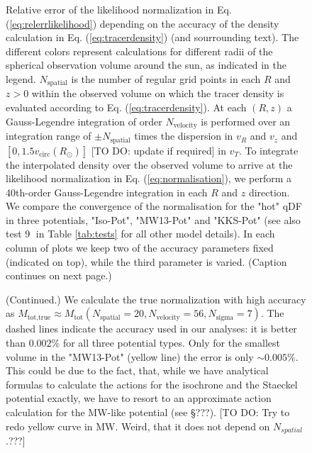 

\begin{figure}
\caption{Relative error of the likelihood normalization in Eq. (\ref{eq:relerrlikelihood}) depending on the accuracy of the density calculation in Eq. (\ref{eq:tracerdensity}) (and sourrounding text). The different colors represent calculations for different radii of the spherical observation volume around the sun, as indicated in the legend. $N_\text{spatial}$ is the number of regular grid points in each $R$ and $z > 0$ within the observed volume on which the tracer density is evaluated according to Eq. (\ref{eq:tracerdensity}). At each $(R,z)$ a Gauss-Legendre integration of order $N_\text{velocity}$ is performed over an integration range of $\pm N_\text{spatial}$ times the dispersion in $v_R$ and $v_z$ and $[0,1.5v_\text{circ}(R_\odot)]$ [TO DO: update if required] in $v_T$. To integrate the interpolated density over the observed volume to arrive at the likelihood normalization in Eq. (\ref{eq:normalisation}), we perform a 40th-order Gauss-Legendre integration in each $R$ and $z$ direction. We compare the convergence of the normalisation for the "hot" qDF in three potentials, "Iso-Pot", "MW13-Pot" and "KKS-Pot" (see also test \textcircled{9} in Table \ref{tab:tests} for all other model details). In each column of plots we keep two of the accuracy parameters fixed (indicated on top), while the third parameter is varied. (Caption continues on next page.)} 
\label{fig:norm_accuracy}
\end{figure}

\addtocounter{figure}{-1}
\begin{figure} [t!]
  \caption{(Continued.) We calculate the true normalization with high accuracy as $M_\text{tot,true} \approx M_\text{tot}(N_\text{spatial}=20,N_\text{velocity}=56,N_\text{sigma}=7)$. The dashed lines indicate the accuracy used in our analyses: it is better than $0.002\%$ for all three potential types. Only for the smallest volume in the "MW13-Pot" (yellow line) the error is only $\sim 0.005\%$. This could be due to the fact, that, while we have analytical formulas to calculate the actions for the isochrone and the Staeckel potential exactly, we have to resort to an approximate action calculation for the MW-like potential (see \S ???). [TO DO: Try to redo yellow curve in MW. Weird, that it does not depend on $N_{spatial}$.???]}
\end{figure}


